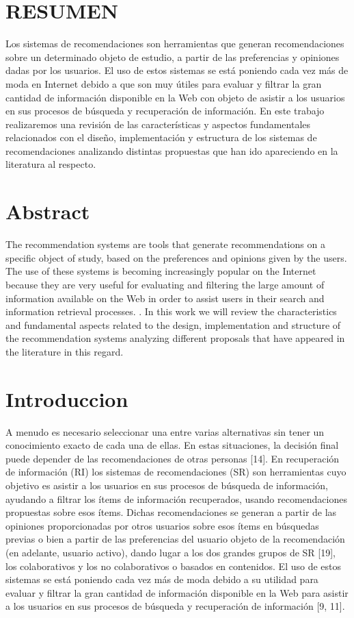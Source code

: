\section{RESUMEN} 

Los sistemas de recomendaciones son herramientas que generan recomendaciones sobre un determinado objeto de estudio, a partir de las preferencias y opiniones dadas por los usuarios. El uso de estos sistemas se está poniendo cada vez más de moda en Internet debido a que son muy útiles para evaluar y filtrar la gran cantidad de información disponible en la Web con objeto de asistir a los usuarios en sus procesos de búsqueda y recuperación de información. En este trabajo realizaremos una revisión de las características y aspectos fundamentales relacionados con el diseño, implementación y estructura de los sistemas de recomendaciones analizando distintas propuestas que han ido apareciendo en la literatura al respecto.


\section{Abstract}
The recommendation systems are tools that generate recommendations on a specific object of study, based on the preferences and opinions given by the users. The use of these systems is becoming increasingly popular on the Internet because they are very useful for evaluating and filtering the large amount of information available on the Web in order to assist users in their search and information retrieval processes. . In this work we will review the characteristics and fundamental aspects related to the design, implementation and structure of the recommendation systems analyzing different proposals that have appeared in the literature in this regard.

\newpage


\section{Introduccion}
A menudo es necesario seleccionar una entre varias alternativas sin tener un conocimiento exacto de cada una de ellas. En estas situaciones, la decisión final puede depender de las recomendaciones de otras personas [14]. En recuperación de información (RI) los sistemas de recomendaciones (SR) son herramientas cuyo objetivo es asistir a los usuarios en sus procesos de búsqueda de información, ayudando a filtrar los ítems de información recuperados, usando recomendaciones propuestas sobre esos ítems. Dichas recomendaciones se generan a partir de las opiniones proporcionadas por otros usuarios sobre esos ítems en búsquedas previas o bien a partir de las preferencias del usuario objeto de la recomendación (en adelante, usuario activo), dando lugar a los dos grandes grupos de SR [19], los colaborativos y los no colaborativos o basados en contenidos. El uso de estos sistemas se está poniendo cada vez más de moda debido a su utilidad para evaluar y filtrar la gran cantidad de información disponible en la Web para asistir a los usuarios en sus procesos de búsqueda y recuperación de información [9, 11].



